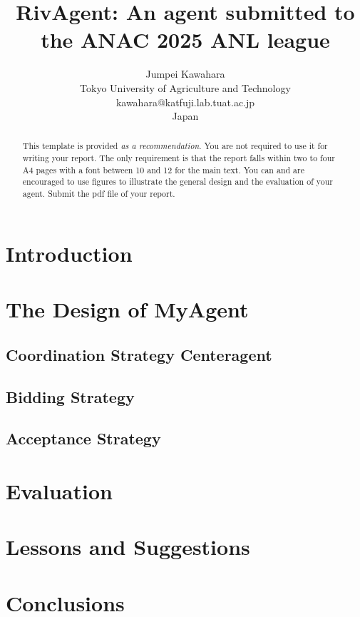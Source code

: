 \documentclass{article}
\title{RivAgent: An agent submitted to the ANAC 2025 ANL league}
\author{Jumpei Kawahara\\Tokyo University of Agriculture and Technology\\kawahara@katfuji.lab.tuat.ac.jp\\Japan}
\begin{document}
\maketitle
\begin{abstract}
	This template is provided \emph{as a recommendation}. You are not required
	to use it for writing your report. The only requirement is that the report
	falls within two to four A4 pages with a font between 10 and 12 for the main
	text. You can and are encouraged to use figures to illustrate the general
	design and the evaluation of your agent. Submit the pdf file of your report.
\end{abstract}
\section{Introduction}
\section{The Design of MyAgent}
\subsection{Coordination Strategy Centeragent}
\subsection{Bidding Strategy}
\subsection{Acceptance Strategy}
\section{Evaluation}
\section{Lessons and Suggestions}
\section*{Conclusions}
\end{document}
